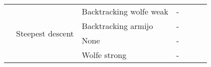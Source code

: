 \documentclass[a4paper,11pt]{article}
\numberwithin{equation}{section} %
\begin{document}
\begin{table}[h!]
\begin{tabular}{|c|l|l|l|l|l|l|}
                                & \multirow{4}{*}{Steepest descent} & Backtracking wolfe weak & -          &          &           &              \\ \cline{3-7} 
                                &                                   & Backtracking armijo     & -          &          &           &              \\ \cline{3-7} 
                                &                                   & None                    & -          &          &           &              \\ \cline{3-7} 
                                &                                   & Wolfe strong            & -          &          &           &              \\ \hline
\end{tabular}
\end{table}

\pagebreak



\subsection{}






\end{document}
